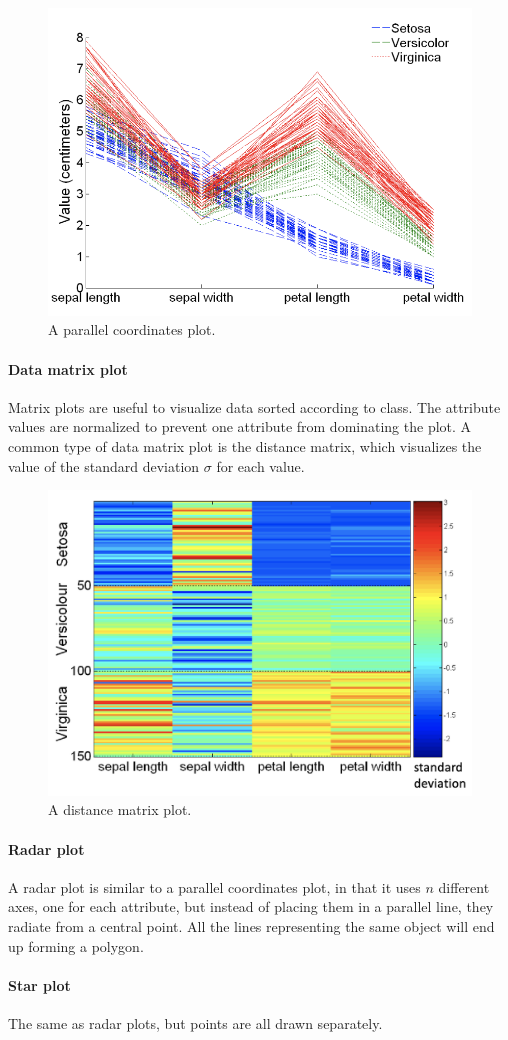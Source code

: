 \begin{figure}[h]
    \centering
    \includegraphics[width=0.4\linewidth]{img/Parallel coord plot.png}  
    \caption{A parallel coordinates plot.}
\end{figure}

\paragraph{Data matrix plot}
Matrix plots are useful to visualize data sorted according to class. The attribute values are normalized to prevent one attribute from dominating the plot. A common type of data matrix plot is the distance matrix, which visualizes the value of the standard deviation $\sigma$ for each value.

\begin{figure}[h]
    \centering
    \includegraphics[width=0.4\linewidth]{img/distance matrix.png}
    \caption{A distance matrix plot.}
\end{figure}

\paragraph{Radar plot}
A radar plot is similar to a parallel coordinates plot, in that it uses $n$ different axes, one for each attribute, but instead of placing them in a parallel line, they radiate from a central point. All the lines representing the same object will end up forming a polygon.

\paragraph{Star plot}
The same as radar plots, but points are all drawn separately.

